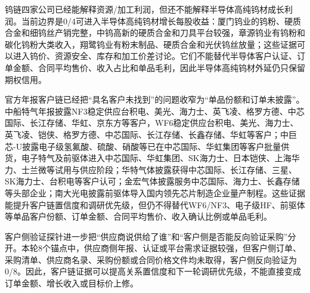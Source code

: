 钨链四家公司已经能解释资源/加工利润，但还不能解释半导体高纯钨材成长利润。当前边界是0/4可进入半导体高纯钨材增长每股收益：厦门钨业的钨粉、硬质合金和细钨丝产销完整，中钨高新的硬质合金和刀具平台较强，章源钨业有钨粉和碳化钨粉大类收入，翔鹭钨业有粉末制品、硬质合金和光伏钨丝放量；这些证据可以进入钨价、资源安全、库存和加工价差讨论。它们不能替代半导体客户认证、订单金额、合同平均售价、收入占比和单品毛利，因此半导体高纯钨材外延仍只保留期权信用。



官方年报客户链已经把“具名客户未找到”的问题收窄为“单品份额和订单未披露”。中船特气年报披露NF3稳定供应台积电、美光、海力士、英飞凌、格罗方德、中芯国际、长江存储、华虹、京东方等客户，WF6稳定供应台积电、美光、海力士、英飞凌、铠侠、格罗方德、中芯国际、长江存储、长鑫存储、华虹等客户；中巨芯-U披露电子级氢氟酸、硫酸、硝酸等已在中芯国际、华虹集团等客户批量供货，电子特气及前驱体进入中芯国际、华虹集团、SK海力士、日本铠侠、上海华力、士兰微等试用与供应阶段；华特气体披露获得中芯国际、长江存储、三星、SK海力士、台积电等客户认可；金宏气体披露服务中芯国际、海力士、长鑫存储等头部企业；南大光电披露前驱体导入国内领先芯片制造企业量产制程。这些证据能提升客户链置信度和调研优先级，但仍不得替代WF6/NF3、电子级HF、前驱体等单品客户份额、订单金额、合同平均售价、收入确认比例或单品毛利。


客户侧验证探针进一步把“供应商说供给了谁”和“客户侧是否能反向验证采购”分开。本轮8个锚点中，供应商侧年报、认证或平台需求证据较强，但客户侧订单、采购清单、供应商名录、采购份额或合同价格文件均未取得，客户侧反向验证为0/8。因此，客户链证据可以提高关系置信度和下一轮调研优先级，不能直接变成订单金额、增长收入或目标价上修。

